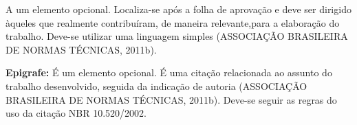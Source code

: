 \documentclass[
  12pt,				    %
  openright,			%
  oneside,			  %
  a4paper,			  %
  chapter=TITLE,  %
  section=TITLE,  %
  english,			  %
  french,				  %
  spanish,			  %
  brazil				  %
]{iftex}
\begin{document}
  
  \graphicspath{{figuras/}}


  \pretextual

  \imprimircapa
  \imprimirfolhaderosto
  \imprimirfichacatalografica
   


  \imprimiraprovacao

  \imprimirdedicatoria
    
  \begin{agradecimentos}
    A um elemento opcional. Localiza-se após a folha de aprovação e deve ser dirigido àqueles que realmente contribuíram, de maneira relevante,para a elaboração do trabalho. Deve-se utilizar uma linguagem simples (ASSOCIAÇÃO BRASILEIRA DE NORMAS TÉCNICAS, 2011b).
  \end{agradecimentos}
  
  \begin{epigrafe}
    \vspace*{\fill}
    \begin{center}
      \textbf{Epigrafe:} É um elemento opcional. É uma citação relacionada ao assunto do trabalho desenvolvido, seguida da indicação de autoria (ASSOCIAÇÃO BRASILEIRA DE NORMAS TÉCNICAS, 2011b).   Deve-se seguir as regras do uso da citação NBR 10.520/2002. 
    \end{center}
  \end{epigrafe}
  
\end{document}
